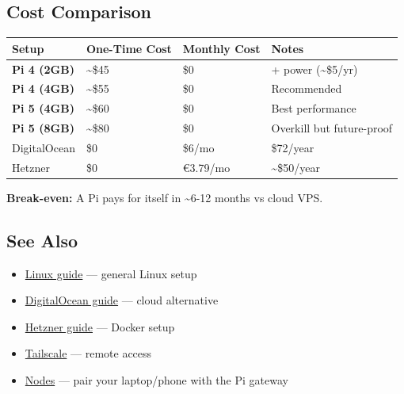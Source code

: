 \hrulefill


\subsection{Cost Comparison}



\begin{table}[h]
\centering
\small
\begin{tabular}{|l|l|l|l|}
\hline
Setup & One-Time Cost & Monthly Cost & Notes \\
\hline
\textbf{Pi 4 (2GB)} & \textasciitilde{}\$45 & \$0 & + power (\textasciitilde{}\$5/yr) \\
\hline
\textbf{Pi 4 (4GB)} & \textasciitilde{}\$55 & \$0 & Recommended \\
\hline
\textbf{Pi 5 (4GB)} & \textasciitilde{}\$60 & \$0 & Best performance \\
\hline
\textbf{Pi 5 (8GB)} & \textasciitilde{}\$80 & \$0 & Overkill but future-proof \\
\hline
DigitalOcean & \$0 & \$6/mo & \$72/year \\
\hline
Hetzner & \$0 & €3.79/mo & \textasciitilde{}\$50/year \\
\hline
\end{tabular}
\end{table}



\textbf{Break-even:} A Pi pays for itself in \textasciitilde{}6-12 months vs cloud VPS.

\hrulefill


\subsection{See Also}


\begin{itemize}
  \item \href{/platforms/linux}{Linux guide} — general Linux setup
  \item \href{/platforms/digitalocean}{DigitalOcean guide} — cloud alternative
  \item \href{/install/hetzner}{Hetzner guide} — Docker setup
  \item \href{/gateway/tailscale}{Tailscale} — remote access
  \item \href{/nodes}{Nodes} — pair your laptop/phone with the Pi gateway
\end{itemize}



\clearpage

